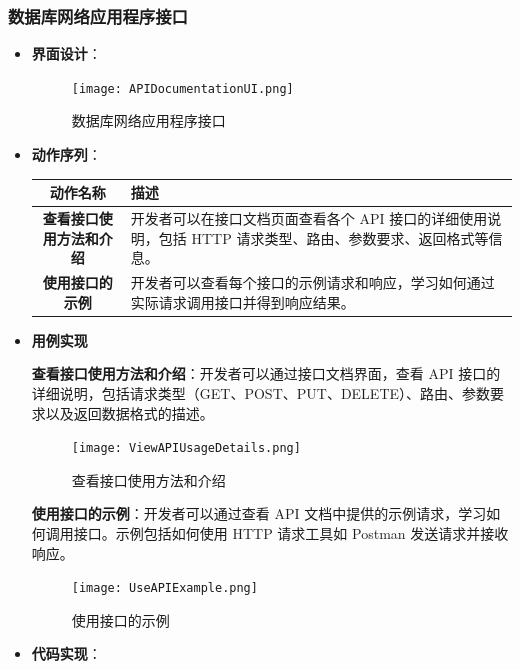 \subsubsection{数据库网络应用程序接口}

\begin{itemize}
	\item \textbf{界面设计}：
	\begin{figure}[H]
		\centering
		\texttt{[image: APIDocumentationUI.png]}
		\caption{数据库网络应用程序接口}
	\end{figure}
	\item \textbf{动作序列}：
	\begin{table}[H]
		\centering
		\renewcommand\arraystretch{1.5}
		\begin{tabular}{|c|>{\raggedright\arraybackslash}p{10cm}|}
			\hline
			\textbf{动作名称} & \textbf{描述} \\ \hline
			\textbf{查看接口使用方法和介绍} & 开发者可以在接口文档页面查看各个 API 接口的详细使用说明，包括 HTTP 请求类型、路由、参数要求、返回格式等信息。\\ \hline
			\textbf{使用接口的示例} & 开发者可以查看每个接口的示例请求和响应，学习如何通过实际请求调用接口并得到响应结果。\\ \hline
		\end{tabular}
	\end{table}
	
	\item \textbf{用例实现}
	
	\textbf{查看接口使用方法和介绍}：开发者可以通过接口文档界面，查看 API 接口的详细说明，包括请求类型（GET、POST、PUT、DELETE）、路由、参数要求以及返回数据格式的描述。
	
	\begin{figure}[H]
		\centering
		\texttt{[image: ViewAPIUsageDetails.png]}
		\caption{查看接口使用方法和介绍}
	\end{figure}
	
	\textbf{使用接口的示例}：开发者可以通过查看 API 文档中提供的示例请求，学习如何调用接口。示例包括如何使用 HTTP 请求工具如 Postman 发送请求并接收响应。
	
	\begin{figure}[H]
		\centering
		\texttt{[image: UseAPIExample.png]}
		\caption{使用接口的示例}
	\end{figure}
	
	\item \textbf{代码实现}：
	
\end{itemize}

